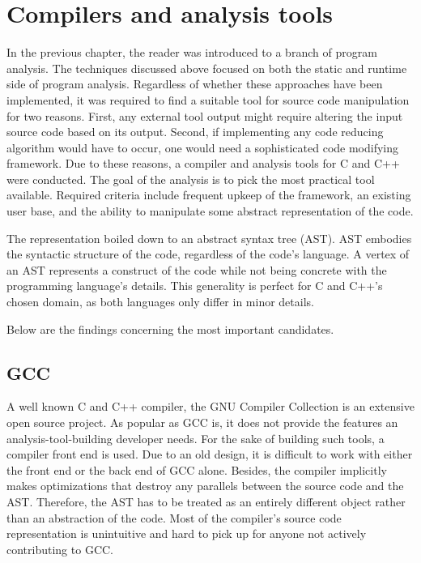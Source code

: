 \chapter{Compilers and analysis tools}

In the previous chapter, the reader was introduced to a branch of program
analysis. 
The techniques discussed above focused on both the static and runtime
side of program analysis. 
Regardless of whether these approaches have been implemented, it was 
required to find a suitable tool for source code manipulation for two reasons. 
First, any external tool output might require altering the input source code 
based on its output. 
Second, if implementing any code reducing algorithm would have to occur, 
one would need a sophisticated code modifying framework. 
Due to these reasons, a compiler and analysis tools for C and C++ were conducted. 
The goal of the analysis is to pick the most practical tool available. 
Required criteria include frequent upkeep of the framework, 
an existing user base, and the ability to manipulate some abstract 
representation of the code.

The representation boiled down to an abstract syntax tree (AST). 
AST embodies the syntactic structure of the code, regardless of the code's language. 
A vertex of an AST represents a construct of the code while not being concrete 
with the programming language's details. 
This generality is perfect for C and C++'s chosen domain, 
as both languages only differ in minor details.

\lipsum[11]

Below are the findings concerning the most important candidates.

\section{GCC}

A well known C and C++ compiler, the GNU Compiler Collection is an extensive
open source project. 
As popular as GCC is, it does not provide the features an analysis-tool-building 
developer needs. 
For the sake of building such tools, a compiler front end is used. 
Due to an old design, it is difficult to work with either the front end or 
the back end of GCC alone. 
Besides, the compiler implicitly makes optimizations that destroy any parallels 
between the source code and the AST. 
Therefore, the AST has to be treated as an entirely different object rather than 
an abstraction of the code. 
Most of the compiler's source code representation is unintuitive and 
hard to pick up for anyone not actively contributing to GCC. 

